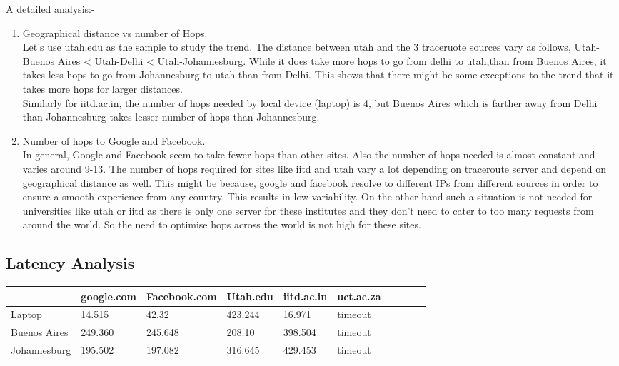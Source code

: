 \documentclass{article}
\begin{document}
A detailed analysis:-

\begin{enumerate} [1.]
\item Geographical distance vs number of Hops.\\
Let's use utah.edu as the sample to study the trend.
The distance between utah and the 3 traceruote sources vary as follows, Utah-Buenos Aires < Utah-Delhi < Utah-Johannesburg. 
While it does take more hops to go from delhi to utah,than from Buenos Aires, it takes less hops to go from Johannesburg
to utah than from Delhi. This shows that there might be some exceptions to the trend that it takes more hops for larger distances.\\
Similarly for iitd.ac.in, the number of hops needed by local device (laptop) is 4, but Buenos Aires which is farther away from Delhi 
than Johannesburg takes lesser number of hops than Johannesburg.
\item Number of hops to Google and Facebook.\\
In general, Google and Facebook seem to take fewer hops than other sites. Also the number of hops needed is almost constant and varies
around 9-13. 
The number of hops required for sites like iitd and utah vary a lot depending on traceroute server and depend on geographical distance
as well.
This might be because, google and facebook resolve to different IPs from different sources in order to ensure a smooth experience from
any country. This results in low variability. On the other hand such a situation is not needed for universities like utah or iitd as 
there is only one server for these institutes and they don't need to cater to too many requests from around the world. So the need 
to optimise hops across the world is not high for these sites.
\end{enumerate}

\subsection*{Latency Analysis}


\begin{table}[!ht]
    \centering
    \begin{tabular}{|l|l|l|l|l|l|l|l|l|l|}
    \hline
        ~ & google.com & Facebook.com & Utah.edu & iitd.ac.in & uct.ac.za \\ \hline
        Laptop & 14.515 & 42.32 & 423.244 & 16.971 & timeout  \\ \hline
        Buenos Aires & 249.360 & 245.648 & 208.10 & 398.504 & timeout  \\ \hline
        Johannesburg & 195.502 & 197.082 & 316.645 & 429.453 & timeout \\ \hline
    \end{tabular}
\end{table}
\end{document}
